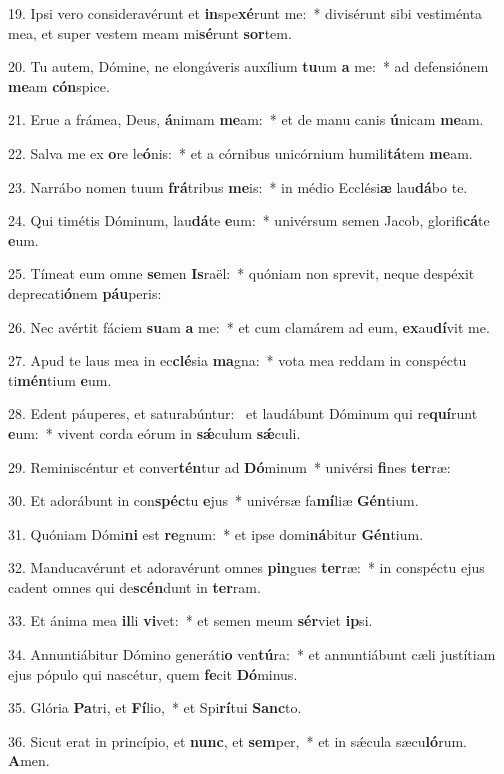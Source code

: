 19. Ipsi vero consideravérunt et \textbf{in}spe\textbf{xé}runt me:~*  divisérunt sibi vestiménta mea, et super vestem meam mi\textbf{sé}runt \textbf{sor}tem.\

20. Tu autem, Dómine, ne elongáveris auxílium \textbf{tu}um \textbf{a} me:~*  ad defensiónem \textbf{me}am \textbf{cón}spice.\

21. Erue a frámea, Deus, \textbf{á}nimam \textbf{me}am:~*  et de manu canis \textbf{ú}nicam \textbf{me}am.\

22. Salva me ex \textbf{o}re le\textbf{ó}nis:~*  et a córnibus unicórnium humili\textbf{tá}tem \textbf{me}am.\

23. Narrábo nomen tuum \textbf{frá}tribus \textbf{me}is:~*  in médio Ecclési\textbf{æ} lau\textbf{dá}bo te.\

24. Qui timétis Dóminum, lau\textbf{dá}te \textbf{e}um:~*  univérsum semen Jacob, glorifi\textbf{cá}te \textbf{e}um.\

25. Tímeat eum omne \textbf{se}men \textbf{Is}raël:~*  quóniam non sprevit, neque despéxit deprecati\textbf{ó}nem \textbf{páu}peris:\

26. Nec avértit fáciem \textbf{su}am \textbf{a} me:~*  et cum clamárem ad eum, \textbf{ex}au\textbf{dí}vit me.\

27. Apud te laus mea in ec\textbf{clé}sia \textbf{ma}gna:~*  vota mea reddam in conspéctu ti\textbf{mén}tium \textbf{e}um.\

28. Edent páuperes, et saturabúntur: \dag\  et laudábunt Dóminum qui re\textbf{quí}runt \textbf{e}um:~*  vivent corda eórum in \textbf{sǽ}culum \textbf{sǽ}culi.\

29. Reminiscéntur et conver\textbf{tén}tur ad \textbf{Dó}minum~*  univérsi \textbf{fi}nes \textbf{ter}ræ:\

30. Et adorábunt in con\textbf{spéc}tu \textbf{e}jus~*  univérsæ fa\textbf{mí}liæ \textbf{Gén}tium.\

31. Quóniam Dómi\textbf{ni} est \textbf{re}gnum:~*  et ipse domi\textbf{ná}bitur \textbf{Gén}tium.\

32. Manducavérunt et adoravérunt omnes \textbf{pin}gues \textbf{ter}ræ:~*  in conspéctu ejus cadent omnes qui de\textbf{scén}dunt in \textbf{ter}ram.\

33. Et ánima mea \textbf{il}li \textbf{vi}vet:~*  et semen meum \textbf{sér}viet \textbf{ip}si.\

34. Annuntiábitur Dómino generáti\textbf{o} ven\textbf{tú}ra:~*  et annuntiábunt cæli justítiam ejus pópulo qui nascétur, quem \textbf{fe}cit \textbf{Dó}minus.\

35. Glória \textbf{Pa}tri, et \textbf{Fí}lio,~*  et Spi\textbf{rí}tui \textbf{Sanc}to.\

36. Sicut erat in princípio, et \textbf{nunc}, et \textbf{sem}per,~*  et in sǽcula sæcu\textbf{ló}rum. \textbf{A}men.\

